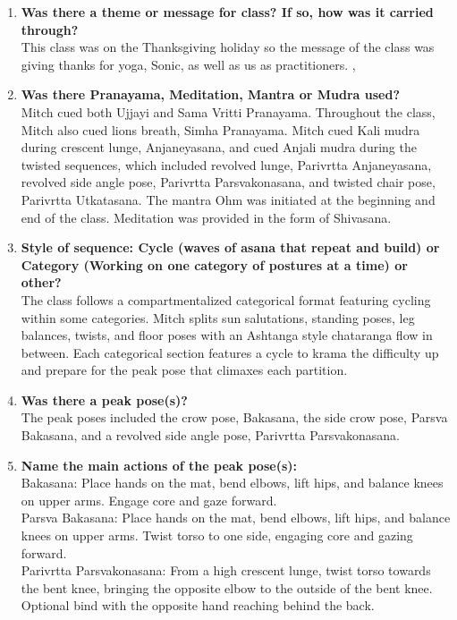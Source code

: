 \documentclass[10pt]{article}
\begin{document}
\begin{enumerate}
    \item \textbf{Was there a theme or message for class? If so, how was it carried through?}\\
    This class was on the Thanksgiving holiday so the message of the class was giving thanks for yoga, Sonic, as well as us as practitioners. , 

    \item \textbf{Was there Pranayama, Meditation, Mantra or Mudra used?}\\
    Mitch cued both Ujjayi and Sama Vritti Pranayama. Throughout the class, Mitch also cued lions breath, Simha Pranayama. Mitch cued Kali mudra during crescent lunge, Anjaneyasana, and cued Anjali mudra during the twisted sequences, which included revolved lunge, Parivrtta Anjaneyasana, revolved side angle pose, Parivrtta Parsvakonasana, and twisted chair pose, Parivrtta Utkatasana. The mantra Ohm was initiated at the beginning and end of the class. Meditation was provided in the form of Shivasana.

    \item \textbf{Style of sequence: Cycle (waves of asana that repeat and build) or Category (Working on one category of postures at a time) or other?}\\
    The class follows a compartmentalized categorical format featuring cycling within some categories. Mitch splits sun salutations, standing poses, leg balances, twists, and floor poses with an Ashtanga style chataranga flow in between. Each categorical section features a cycle to krama the difficulty up and prepare for the peak pose that climaxes each partition. 
    
    \item \textbf{Was there a peak pose(s)?}\\
    The peak poses included the crow pose, Bakasana, the side crow pose, Parsva Bakasana, and a revolved side angle pose, Parivrtta Parsvakonasana.

    \item \textbf{Name the main actions of the peak pose(s):}\\
    Bakasana: Place hands on the mat, bend elbows, lift hips, and balance knees on upper arms. Engage core and gaze forward.\\
    Parsva Bakasana: Place hands on the mat, bend elbows, lift hips, and balance knees on upper arms. Twist torso to one side, engaging core and gazing forward.\\
    Parivrtta Parsvakonasana: From a high crescent lunge, twist torso towards the bent knee, bringing the opposite elbow to the outside of the bent knee. Optional bind with the opposite hand reaching behind the back.


\end{enumerate}
\end{document}
